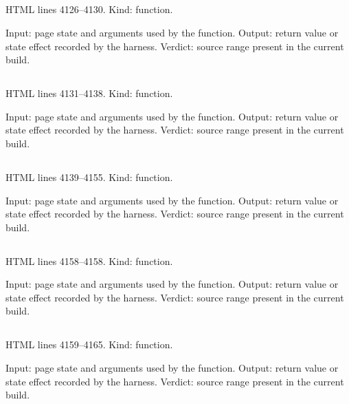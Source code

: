 \subsection*{\texttt{}}
\label{vf_145_withExportNames}
HTML lines 4126--4130. Kind: function.

Input: page state and arguments used by the function.
Output: return value or state effect recorded by the harness.
Verdict: source range present in the current build.

\subsection*{\texttt{}}
\label{vf_146_rqRows}
HTML lines 4131--4138. Kind: function.

Input: page state and arguments used by the function.
Output: return value or state effect recorded by the harness.
Verdict: source range present in the current build.

\subsection*{\texttt{}}
\label{vf_147_edsSignalRows}
HTML lines 4139--4155. Kind: function.

Input: page state and arguments used by the function.
Output: return value or state effect recorded by the harness.
Verdict: source range present in the current build.

\subsection*{\texttt{}}
\label{vf_148_xlsxCol}
HTML lines 4158--4158. Kind: function.

Input: page state and arguments used by the function.
Output: return value or state effect recorded by the harness.
Verdict: source range present in the current build.

\subsection*{\texttt{}}
\label{vf_149_xlsxCell}
HTML lines 4159--4165. Kind: function.

Input: page state and arguments used by the function.
Output: return value or state effect recorded by the harness.
Verdict: source range present in the current build.

